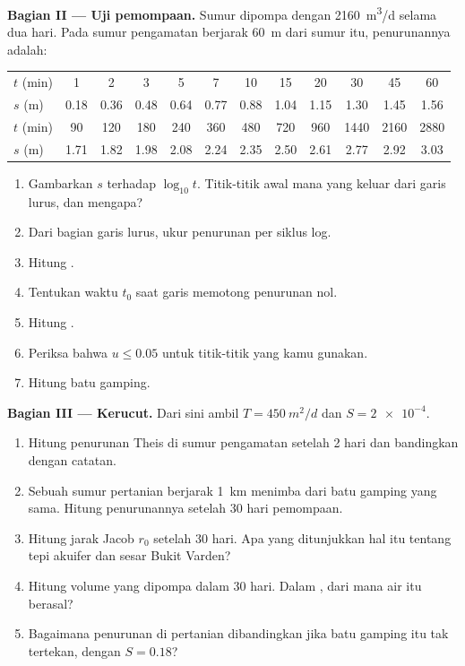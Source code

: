 \begin{problem}
\medskip\noindent\textbf{Bagian II --- Uji pemompaan.} Sumur dipompa
dengan \qty{2160}{m^3/d} selama dua hari. Pada sumur pengamatan berjarak \qty{60}{m}
dari sumur itu, penurunannya adalah:
\begin{center}
\begin{tabular}{l*{11}{c}}
\hline
$t$ (\unit{min}) & 1 & 2 & 3 & 5 & 7 & 10 & 15 & 20 & 30 & 45 & 60\\
$s$ (\unit{m}) & 0.18 & 0.36 & 0.48 & 0.64 & 0.77 & 0.88 & 1.04 & 1.15 & 1.30 & 1.45 & 1.56\\
\hline
$t$ (\unit{min}) & 90 & 120 & 180 & 240 & 360 & 480 & 720 & 960 & 1440 & 2160 & 2880\\
$s$ (\unit{m}) & 1.71 & 1.82 & 1.98 & 2.08 & 2.24 & 2.35 & 2.50 & 2.61 & 2.77 & 2.92 & 3.03\\
\hline
\end{tabular}
\end{center}
\begin{enumerate}[resume]
\item Gambarkan $s$ terhadap $\log_{10}t$. Titik-titik awal mana yang keluar
  dari garis lurus, dan mengapa?
\item Dari bagian garis lurus, ukur penurunan per siklus log.
\item Hitung .
\item Tentukan waktu $t_0$ saat garis memotong penurunan nol.
\item Hitung .
\item Periksa bahwa $u \le 0.05$ untuk titik-titik yang kamu gunakan.
\item Hitung  batu gamping.
\end{enumerate}

\medskip\noindent\textbf{Bagian III --- Kerucut.} Dari sini ambil $T =
\qty{450}{m^2/d}$ dan $S = \num{2e-4}$.
\begin{enumerate}[resume]
\item Hitung penurunan Theis di sumur pengamatan setelah 2 hari dan
  bandingkan dengan catatan.
\item Sebuah sumur pertanian berjarak \qty{1}{km} menimba dari batu gamping yang sama. Hitung
  penurunannya setelah 30 hari pemompaan.
\item Hitung jarak Jacob $r_0$ setelah 30 hari. Apa yang ditunjukkan hal itu tentang
  tepi akuifer dan sesar Bukit Varden?
\item Hitung volume yang dipompa dalam 30 hari. Dalam ,
  dari mana air itu berasal?
\item Bagaimana penurunan di pertanian dibandingkan jika batu gamping itu
  tak tertekan, dengan $S = 0.18$?
\end{enumerate}


\end{problem}
